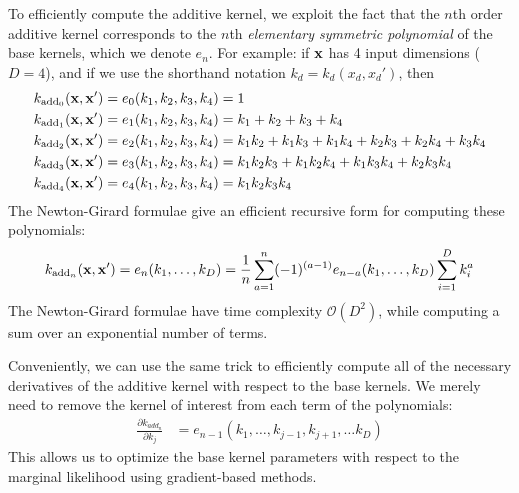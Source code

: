 To efficiently compute the additive kernel, we exploit the fact that the $n$th order additive kernel corresponds to the $n$th \textit{elementary symmetric polynomial} \citep{macdonald1998symmetric}
of the base kernels, which we denote $e_n$.
For example:  if ${\bf{x}}$ has 4 input dimensions ($D = 4$), and if we use the shorthand notation $k_d = k_d(x_d, x_d')$, then
%
\begin{align}
k_{\textnormal{add}_0}({\bf x, x'}) & = e_0( k_1, k_2, k_3, k_4 ) = 1 \\
k_{\textnormal{add}_1}({\bf x, x'}) & = e_1( k_1, k_2, k_3, k_4 ) = k_1 + k_2 + k_3 + k_4 \\
k_{\textnormal{add}_2}({\bf x, x'}) & = e_2( k_1, k_2, k_3, k_4 ) = k_1 k_2 + k_1 k_3 + k_1k_4 + k_2 k_3 + k_2 k_4 + k_3 k_4 \\
k_{\textnormal{add}_3}({\bf x, x'}) & = e_3( k_1, k_2, k_3, k_4 ) = k_1 k_2 k_3 + k_1 k_2 k_4 + k_1 k_3 k_4 + k_2 k_3 k_4 \\
k_{\textnormal{add}_4}({\bf x, x'}) & = e_4( k_1, k_2, k_3, k_4 ) = k_1 k_2 k_3 k_4
\end{align}
%
The Newton-Girard formulae give an efficient recursive form for computing these polynomials:
%
\begin{align}
k_{\textnormal{add}_n}({\bf x, x'}) = e_n(k_1,\dots,k_D) = \frac{1}{n} \sum_{a=1}^n (-1)^{(a-1)} e_{n-a}(k_1,\dots,k_D)  \sum_{i=1}^Dk_i^a
\end{align}
%
The Newton-Girard formulae have time complexity $\mathcal{O}( D^2 )$, while computing a sum over an exponential number of terms.

Conveniently, we can use the same trick to efficiently compute all of the necessary derivatives of the additive kernel with respect to the base kernels.
We merely need to remove the kernel of interest from each term of the polynomials:
%
\begin{align}
\frac{\partial k_{add_n}}{\partial k_j} & = e_{n-1}(k_1,\dots,k_{j-1},k_{j+1}, \dots k_D)
\end{align}
%
This allows us to optimize the base kernel parameters with respect to the marginal likelihood using gradient-based methods.

